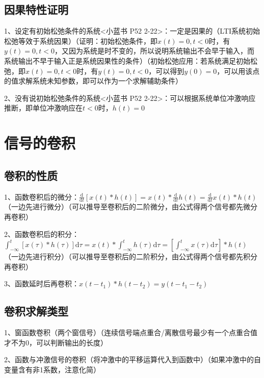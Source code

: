 \subsection{因果特性证明}

1、设定有初始松弛条件的系统<小蓝书 P52 2-22>：一定是因果的（LTI系统初始松弛等效于系统因果）（证明：初始松弛条件，即$x(t)=0,t<0$时，有$y(t)=0,t<0$，又因为系统是时不变的，所以说明系统输出不会早于输入，而系统输出不早于输入正是系统因果性的条件）（初始松弛应用：若系统满足初始松弛，即$x(t)=0,t<0$时，有$y(t)=0,t<0 $，可以得到$y(0)=0$，可以用该点的值求解系统未知参数，即可以作为一个求解辅助条件）

2、没有说初始松弛条件的系统<小蓝书 P52 2-22>：可以根据系统单位冲激响应推断，即单位冲激响应在$t<0$时，$h(t)=0$

\section{信号的卷积}



\subsection{卷积的性质}

1、函数卷积后的微分：$\frac{\mathrm{d}}{\mathrm{d} t}[x(t) * h(t)]=x(t) * \frac{\mathrm{d}}{\mathrm{d} t} h(t)=\frac{\mathrm{d}}{\mathrm{d} t} x(t) * h(t)$（一边先进行微分）（可以推导至卷积后的二阶微分，由公式得两个信号都先微分再卷积）

2、函数卷积后的积分：$\int_{-\infty}^{t}[x(\tau) * h(\tau)] \mathrm{d} \tau=x(t) * \int_{-\infty}^{t} h(\tau) \mathrm{d} \tau=\left[\int_{-\infty}^{t} x(\tau) \mathrm{d} \tau\right] * h(t)$（一边先进行积分）（可以推导至卷积后的二阶积分，由公式得两个信号都先积分再卷积）

3、函数延时后再卷积：$x\left(t-t_{1}\right) * h\left(t-t_{2}\right)=y\left(t-t_{1}-t_{2}\right)$



\subsection{卷积求解类型}

1、窗函数卷积（两个窗信号）（连续信号端点重合/离散信号最少有一个点重合值才不为0，可以判断输出的长度）

2、函数与冲激信号的卷积（将冲激中的平移运算代入到函数中）（如果冲激中的自变量含有非1系数，注意化简）


